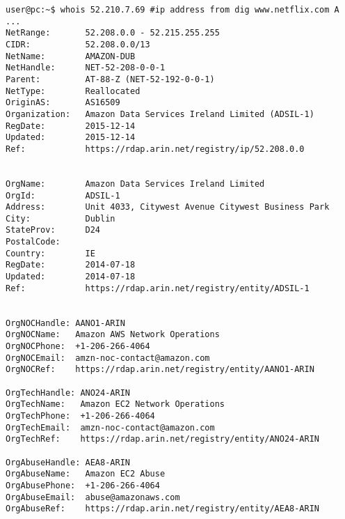 \documentclass[a4paper, 11pt]{article}
\begin{document}
\begin{lstlisting}[caption={Referenčný Whois dotaz nad doménov \textbf{www.netflix.com}.},captionpos=b, label={whois_refer_2}]
user@pc:~$ whois 52.210.7.69 #ip address from dig www.netflix.com A
...
NetRange:       52.208.0.0 - 52.215.255.255
CIDR:           52.208.0.0/13
NetName:        AMAZON-DUB
NetHandle:      NET-52-208-0-0-1
Parent:         AT-88-Z (NET-52-192-0-0-1)
NetType:        Reallocated
OriginAS:       AS16509
Organization:   Amazon Data Services Ireland Limited (ADSIL-1)
RegDate:        2015-12-14
Updated:        2015-12-14
Ref:            https://rdap.arin.net/registry/ip/52.208.0.0


OrgName:        Amazon Data Services Ireland Limited
OrgId:          ADSIL-1
Address:        Unit 4033, Citywest Avenue Citywest Business Park
City:           Dublin
StateProv:      D24
PostalCode:     
Country:        IE
RegDate:        2014-07-18
Updated:        2014-07-18
Ref:            https://rdap.arin.net/registry/entity/ADSIL-1


OrgNOCHandle: AANO1-ARIN
OrgNOCName:   Amazon AWS Network Operations
OrgNOCPhone:  +1-206-266-4064 
OrgNOCEmail:  amzn-noc-contact@amazon.com
OrgNOCRef:    https://rdap.arin.net/registry/entity/AANO1-ARIN

OrgTechHandle: ANO24-ARIN
OrgTechName:   Amazon EC2 Network Operations
OrgTechPhone:  +1-206-266-4064 
OrgTechEmail:  amzn-noc-contact@amazon.com
OrgTechRef:    https://rdap.arin.net/registry/entity/ANO24-ARIN

OrgAbuseHandle: AEA8-ARIN
OrgAbuseName:   Amazon EC2 Abuse
OrgAbusePhone:  +1-206-266-4064 
OrgAbuseEmail:  abuse@amazonaws.com
OrgAbuseRef:    https://rdap.arin.net/registry/entity/AEA8-ARIN
\end{lstlisting}
\end{document}
